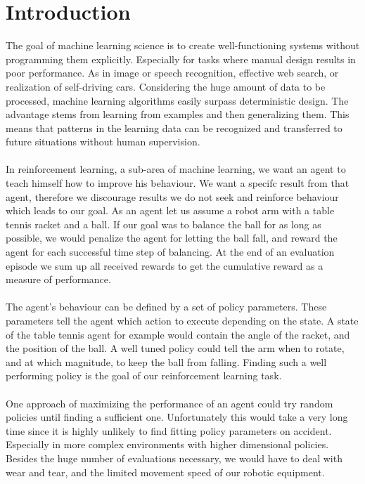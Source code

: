 \chapter{Introduction}
\label{chap:0}

The goal of machine learning science is to create well-functioning systems without programming them explicitly. Especially for tasks where manual design results in poor performance. As in image or speech recognition, effective web search, or realization of self-driving cars. Considering the huge amount of data to be processed, machine learning algorithms easily surpass deterministic design. The advantage stems from learning from examples and then generalizing them. This means that patterns in the learning data can be recognized and transferred to future situations without human supervision.\\
\\
In reinforcement learning, a sub-area of machine learning, we want an agent to teach himself how to improve his behaviour. We want a specifc result from that agent, therefore we discourage results we do not seek and reinforce behaviour which leads to our goal. As an agent let us assume a robot arm with a table tennis racket and a ball. If our goal was to balance the ball for as long as possible, we would penalize the agent for letting the ball fall, and reward the agent for each successful time step of balancing. At the end of an evaluation episode we sum up all received rewards to get the cumulative reward as a measure of performance.\\
\\
The agent's behaviour can be defined by a set of policy parameters. These parameters tell the agent which action to execute depending on the state. A state of the table tennis agent for example would contain the angle of the racket, and the position of the ball. A well tuned policy could tell the arm when to rotate, and at which magnitude, to keep the ball from falling. Finding such a well performing policy is the goal of our reinforcement learning task.\\
\\
One approach of maximizing the performance of an agent could try random policies until finding a sufficient one. Unfortunately this would take a very long time since it is highly unlikely to find fitting policy parameters on accident. Especially in more complex environments with higher dimensional policies. Besides the huge number of evaluations necessary, we would have to deal with wear and tear, and the limited movement speed of our robotic equipment.\\
